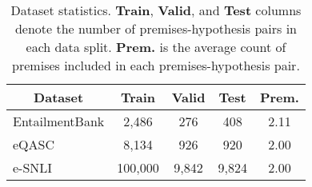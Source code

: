 \begin{table}[t]
    \small
    \centering
    \begin{tabular}{l|c|c|c|c}
         \multicolumn{1}{c|}{Dataset} & Train & Valid & Test & Prem. \\
         \hline \hline
         EntailmentBank & 2,486 & 276 & 408 & 2.11 \\
         eQASC & 8,134 & 926 & 920 & 2.00 \\
         e-SNLI & 100,000 & 9,842 & 9,824 & 2.00 \\
    \end{tabular}
    \caption{Dataset statistics. \textbf{Train}, \textbf{Valid}, and \textbf{Test} columns denote the number of premises-hypothesis pairs in each data split. \textbf{Prem.} is the average count of premises included in each premises-hypothesis pair.}
\label{tab:datasets}
\end{table}